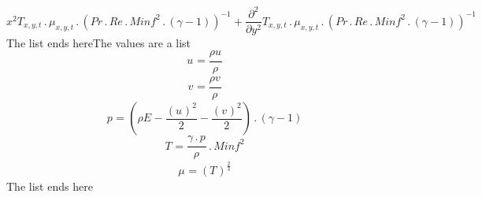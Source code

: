 \documentclass{article}
\begin{document}
\begin{dmath}
{x^{2}}  {T}_{x,y,t} \,.\, {\mu}_{x,y,t} \,.\, \left(Pr \,.\, Re \,.\, 
Minf^{2} \,.\, \left(\gamma - 1\right)\right)^{-1} + 
\frac{\partial^{2}}{\partial y^{2}}  {T}_{x,y,t} \,.\, {\mu}_{x,y,t} 
\,.\, \left(Pr \,.\, Re \,.\, Minf^{2} \,.\, \left(\gamma - 
1\right)\right)^{-1}\end{dmath}  The list ends hereThe values are a list    \begin{dmath}{u}_{} = \frac{{\rho 
u}_{}}{{\rho}_{}}\end{dmath}  \begin{dmath}{v}_{} = \frac{{\rho 
v}_{}}{{\rho}_{}}\end{dmath}  \begin{dmath}{p}_{} = \left({\rho E}_{} 
- \frac{\left({u}_{}\right)^{2}}{2} - 
\frac{\left({v}_{}\right)^{2}}{2}\right) \,.\, \left(\gamma - 
1\right)\end{dmath}  \begin{dmath}{T}_{} = \frac{\gamma \,.\, 
{p}_{}}{{\rho}_{}} \,.\, Minf^{2}\end{dmath}  \begin{dmath}{\mu}_{} = 
\left({T}_{}\right)^{\frac{2}{3}}\end{dmath}  The list ends here
\end{document}
